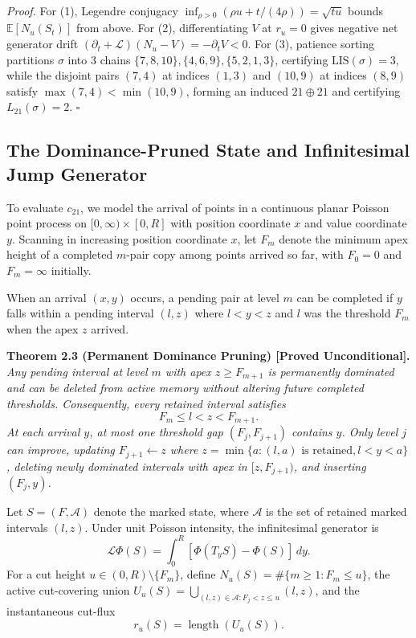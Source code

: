 \documentclass[
  11pt,
]{article}
\begin{document}
\emph{Proof.} For (1), Legendre conjugacy \(\inf_{\rho > 0}(\rho u + t/(4\rho)) = \sqrt{tu}\) bounds \(\mathbb{E}[N_u(S_t)]\) from above. For (2), differentiating \(V\) at \(r_u = 0\) gives negative net generator drift \((\partial_t + \mathcal{L})(N_u - V) = -\partial_t V < 0\). For (3), patience sorting partitions \(\sigma\) into 3 chains \(\{7, 8, 10\}, \{4, 6, 9\}, \{5, 2, 1, 3\}\), certifying \(\mathrm{LIS}(\sigma) = 3\), while the disjoint pairs \((7, 4)\) at indices \((1, 3)\) and \((10, 9)\) at indices \((8, 9)\) satisfy \(\max(7, 4) < \min(10, 9)\), forming an induced \(21 \oplus 21\) and certifying \(L_{21}(\sigma) = 2\). \(\square\)

\subsection{The Dominance-Pruned State and Infinitesimal Jump
Generator}\label{the-dominance-pruned-state-and-infinitesimal-jump-generator}

To evaluate \(c_{21}\), we model the arrival of points in a continuous
planar Poisson point process on \([0, \infty) \times [0, R]\) with
position coordinate \(x\) and value coordinate \(y\). Scanning in
increasing position coordinate \(x\), let \(F_m\) denote the minimum
apex height of a completed \(m\)-pair copy among points arrived so far,
with \(F_0 = 0\) and \(F_m = \infty\) initially.

When an arrival \((x, y)\) occurs, a pending pair at level \(m\) can be
completed if \(y\) falls within a pending interval \((l, z)\) where
\(l < y < z\) and \(l\) was the threshold \(F_m\) when the apex \(z\)
arrived.

\textbf{Theorem 2.3 (Permanent Dominance Pruning) [Proved Unconditional].} \emph{Any pending
interval at level \(m\) with apex \(z \ge F_{m+1}\) is permanently
dominated and can be deleted from active memory without altering future
completed thresholds. Consequently, every retained interval satisfies}
\[
F_m \le l < z < F_{m+1}.
\] \emph{At each arrival \(y\), at most one threshold gap
\((F_j, F_{j+1})\) contains \(y\). Only level \(j\) can improve,
updating \(F_{j+1} \leftarrow z\) where
\(z = \min \{a : (l, a) \text{ is retained}, l < y < a\}\), deleting
newly dominated intervals with apex in \([z, F_{j+1})\), and inserting
\((F_j, y)\).}

Let \(S = (F, \mathcal{A})\) denote the marked state, where
\(\mathcal{A}\) is the set of retained marked intervals \((l, z)\).
Under unit Poisson intensity, the infinitesimal generator is \[
\mathcal{L} \Phi(S) = \int_0^R [\Phi(T_y S) - \Phi(S)] \, dy.
\] For a cut height \(u \in (0, R) \setminus \{F_m\}\), define
\(N_u(S) = \#\{m \ge 1 : F_m \le u\}\), the active cut-covering union
\(U_u(S) = \bigcup_{(l, z) \in \mathcal{A} : F_j < z \le u} (l, z)\),
and the instantaneous cut-flux \[
r_u(S) = \operatorname{length}(U_u(S)).
\]
\end{document}
